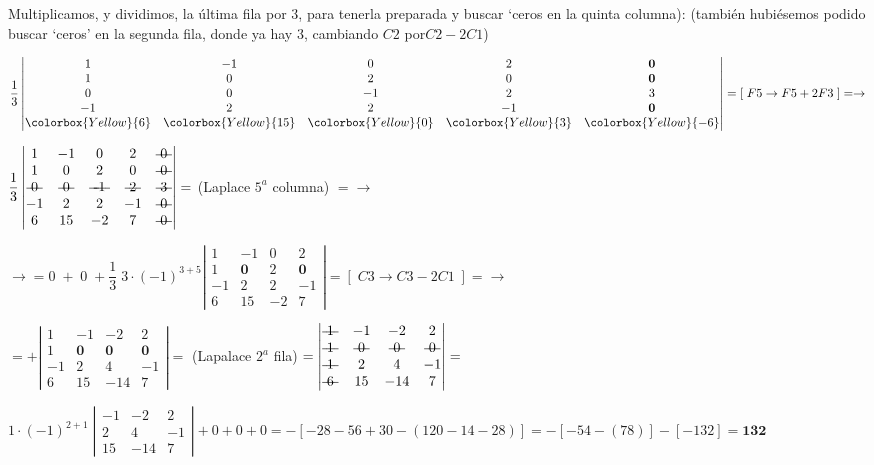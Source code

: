 \begin{proofw}
Multiplicamos, y dividimos, la última fila por $3$, para tenerla preparada y buscar `ceros en la quinta columna): \textcolor{gris}{(también hubiésemos podido buscar `ceros' en la segunda fila, donde ya hay $3$, cambiando $C2$ por$C2-2C1$)}

\noindent $\dfrac 1 3  \left| \begin{matrix} 1&-1&0&2&\boldsymbol{0}\\1&0&2&0&\boldsymbol{0}\\0&0&-1&2&3\\-1&2&2&-1&\boldsymbol{0}\\\colorbox{Yellow}{6}&\colorbox{Yellow}{15}&\colorbox{Yellow}{0}&\colorbox{Yellow}{3}&\colorbox{Yellow}{-6}   \end{matrix} \right|= 
[\;F5 \to F5+2F3\;] = \to $

\noindent $\dfrac 1 3  \left| \begin{matrix} 1&-1&0&2&\text{\textst{ 0 }}	\\1&0&2&0&\text{\textst{ 0 }}	\\\text{\textst{ 0 }}	&\text{\textst{ 0 }}	&\text{\textst{ -1 }}	&\text{\textst{ 2 }}	&\text{\textst{ 3 }}	\\-1&2&2&-1&\text{\textst{ 0 }}	\\6&15&-2&7&\text{\textst{ 0 }}	   \end{matrix} \right|= $ (Laplace $5^a$ columna) $=\to$

\noindent $\to =0\; +\; 0\; + \dfrac 1 3\; 3 \cdot (-1)^{3+5} \left|
\begin{matrix}   1&-1&0&2\\1&\boldsymbol{ 0}&2&\boldsymbol{ 0}\\-1&2&2&-1 \\6&15&-2&7  \end{matrix} \right| = [\; C3 \to C3-2C1 \;  ] = \to $

\noindent $=+\left|
\begin{matrix}   1&-1&-2&2\\1&\boldsymbol{ 0}&\boldsymbol{0} &\boldsymbol{ 0}\\-1&2&4&-1 \\6&15&-14&7  \end{matrix} \right|=$  (Lapalace $2^a$ fila) 
$=   \left|
\begin{matrix}   \text{\textst{ 1 }}&-1&-2&2\\\text{\textst{ 1 }}&\text{\textst{ 0 }}&\text{\textst{ 0 }} &\text{\textst{ 0 }}\\\text{\textst{ 1 }}&2&4&-1 \\\text{\textst{ 6 }}&15&-14&7  \end{matrix} \right| = $


\noindent $1\cdot (-1)^{2+1}\; \left| \begin{matrix}  -1&-2&2\\2&4&-1\\15&-14&7 \end{matrix} \right| +0+0+0= -[-28-56+30-(120-14-28)]=-[-54-(78)]-[-132]=\boldsymbol{132}$
\end{proofw}


